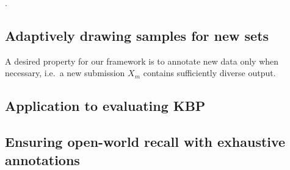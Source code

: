 .

\subsection{Adaptively drawing samples for new sets}
A desired property for our framework is to annotate new data only when necessary, i.e.\ a new submission $X_m$ contains sufficiently diverse output.


\subsection{Application to evaluating KBP}




\subsection{Ensuring open-world recall with exhaustive annotations}

